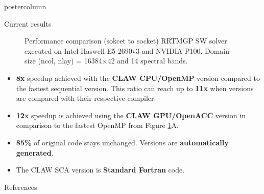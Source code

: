 \documentclass{beamer}
\begin{document}
\begin{frame}
\begin{columns}
\begin{column}{.57\textwidth}
\begin{beamercolorbox}[center]{postercolumn}
\begin{minipage}{.98\textwidth}
{\begin{myblock}{Current results}
\begin{figure}[ht]
  \caption[Performance comparison RRTMGP SW solver]{Performance comparison
  (sokcet to socket) RRTMGP SW solver executed on Intel Haswell E5-2690v3 and
  NVIDIA P100. Domain size (ncol, nlay) = 16384$\times$42 and 14 spectral bands.
  }
  \label{fig:perf_sw}
\end{figure}

\begin{itemize}
  \item \textbf{8x} speedup achieved with the \textbf{CLAW CPU/OpenMP} version
        compared to the fastest sequential version. This ratio can reach up to
        \textbf{11x} when versions are compared with their respective compiler.
  \item \textbf{12x} speedup is achieved using the \textbf{CLAW GPU/OpenACC}
        version in comparison to the fastest OpenMP from
        Figure \ref{fig:perf_sw}A.
  \item \textbf{85\%} of original code stays unchanged. Versions are
        \textbf{automatically generated}.
  \item The CLAW SCA version is \textbf{Standard Fortran} code.
\end{itemize}

\end{myblock}\vfill

%
%
\begin{myblock}{References}
\footnotesize


\end{myblock}\vfill


}\end{minipage}\end{beamercolorbox}
\end{column}
\end{columns}
\end{frame}
\end{document}
